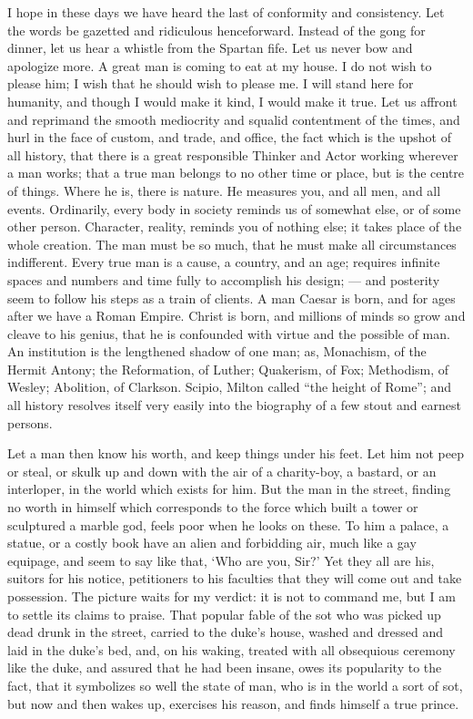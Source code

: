 \documentclass{article}
\begin{document}
I hope in these days we have heard the last of conformity and consistency.
Let the words be gazetted and ridiculous henceforward. Instead of the gong
for dinner, let us hear a whistle from the Spartan fife. Let us never bow
and apologize more. A great man is coming to eat at my house. I do not wish
to please him; I wish that he should wish to please me. I will stand here
for humanity, and though I would make it kind, I would make it true. Let us
affront and reprimand the smooth mediocrity and squalid contentment of the
times, and hurl in the face of custom, and trade, and office, the fact which
is the upshot of all history, that there is a great responsible Thinker and
Actor working wherever a man works; that a true man belongs to no other time
or place, but is the centre of things. Where he is, there is nature. He
measures you, and all men, and all events. Ordinarily, every body in society
reminds us of somewhat else, or of some other person. Character, reality,
reminds you of nothing else; it takes place of the whole creation. The man
must be so much, that he must make all circumstances indifferent. Every true
man is a cause, a country, and an age; requires infinite spaces and numbers
and time fully to accomplish his design; --- and posterity seem to follow his
steps as a train of clients. A man Caesar is born, and for ages after we
have a Roman Empire. Christ is born, and millions of minds so grow and
cleave to his genius, that he is confounded with virtue and the possible of
man. An institution is the lengthened shadow of one man; as, Monachism, of
the Hermit Antony; the Reformation, of Luther; Quakerism, of Fox; Methodism,
of Wesley; Abolition, of Clarkson. Scipio, Milton called ``the height of
Rome''; and all history resolves itself very easily into the biography of a
few stout and earnest persons.

Let a man then know his worth, and keep things under his feet. Let him not
peep or steal, or skulk up and down with the air of a charity-boy, a
bastard, or an interloper, in the world which exists for him. But the man in
the street, finding no worth in himself which corresponds to the force which
built a tower or sculptured a marble god, feels poor when he looks on these.
To him a palace, a statue, or a costly book have an alien and forbidding
air, much like a gay equipage, and seem to say like that, `Who are you,
Sir?' Yet they all are his, suitors for his notice, petitioners to his
faculties that they will come out and take possession. The picture waits for
my verdict: it is not to command me, but I am to settle its claims to
praise. That popular fable of the sot who was picked up dead drunk in the
street, carried to the duke's house, washed and dressed and laid in the
duke's bed, and, on his waking, treated with all obsequious ceremony like
the duke, and assured that he had been insane, owes its popularity to the
fact, that it symbolizes so well the state of man, who is in the world a
sort of sot, but now and then wakes up, exercises his reason, and finds
himself a true prince.
\end{document}
